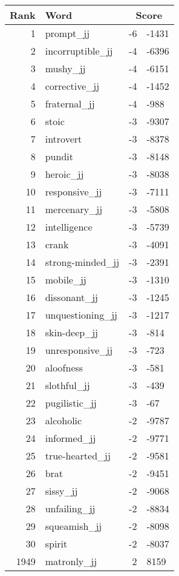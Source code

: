 \begin{longtable}[!htbp]{| rlr@{.}l |}
    \hline
    \textbf{Rank} & \textbf{Word} & \multicolumn{2}{c|}{\textbf{Score}} \\
    \hline
    \endhead
    1 & prompt\_jj & -6 & -1431 \\
    2 & incorruptible\_jj & -4 & -6396 \\
    3 & mushy\_jj & -4 & -6151 \\
    4 & corrective\_jj & -4 & -1452 \\
    5 & fraternal\_jj & -4 & -988 \\
    6 & stoic & -3 & -9307 \\
    7 & introvert & -3 & -8378 \\
    8 & pundit & -3 & -8148 \\
    9 & heroic\_jj & -3 & -8038 \\
    10 & responsive\_jj & -3 & -7111 \\
    11 & mercenary\_jj & -3 & -5808 \\
    12 & intelligence & -3 & -5739 \\
    13 & crank & -3 & -4091 \\
    14 & strong-minded\_jj & -3 & -2391 \\
    15 & mobile\_jj & -3 & -1310 \\
    16 & dissonant\_jj & -3 & -1245 \\
    17 & unquestioning\_jj & -3 & -1217 \\
    18 & skin-deep\_jj & -3 & -814 \\
    19 & unresponsive\_jj & -3 & -723 \\
    20 & aloofness & -3 & -581 \\
    21 & slothful\_jj & -3 & -439 \\
    22 & pugilistic\_jj & -3 & -67 \\
    23 & alcoholic & -2 & -9787 \\
    24 & informed\_jj & -2 & -9771 \\
    25 & true-hearted\_jj & -2 & -9581 \\
    26 & brat & -2 & -9451 \\
    27 & sissy\_jj & -2 & -9068 \\
    28 & unfailing\_jj & -2 & -8834 \\
    29 & squeamish\_jj & -2 & -8098 \\
    30 & spirit & -2 & -8037 \\
    1949 & matronly\_jj & 2 & 8159 \\

\end{longtable}
